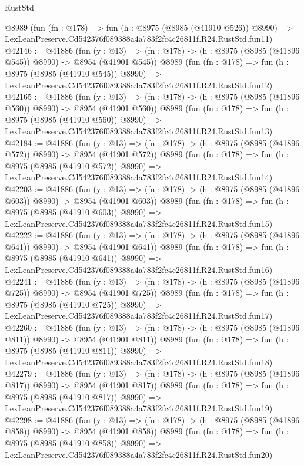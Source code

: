 \begin{lexlean}{RustStd}
\begin{coremodule}
    @8989
    (fun (fn : @178) =>
    fun (h : @8975 (@8985 (@41910 @526)) @8990) =>
    LexLeanPreserve.Cd542376f089388a4a783f2fc4c26811f.R24.RustStd.fun11)
@42146 := @41886
    (fun (y : @13) => (fn : @178) -> (h : @8975 (@8985 (@41896 @545)) @8990) -> @8954 (@41901 @545))
    @8989
    (fun (fn : @178) =>
    fun (h : @8975 (@8985 (@41910 @545)) @8990) =>
    LexLeanPreserve.Cd542376f089388a4a783f2fc4c26811f.R24.RustStd.fun12)
@42165 := @41886
    (fun (y : @13) => (fn : @178) -> (h : @8975 (@8985 (@41896 @560)) @8990) -> @8954 (@41901 @560))
    @8989
    (fun (fn : @178) =>
    fun (h : @8975 (@8985 (@41910 @560)) @8990) =>
    LexLeanPreserve.Cd542376f089388a4a783f2fc4c26811f.R24.RustStd.fun13)
@42184 := @41886
    (fun (y : @13) => (fn : @178) -> (h : @8975 (@8985 (@41896 @572)) @8990) -> @8954 (@41901 @572))
    @8989
    (fun (fn : @178) =>
    fun (h : @8975 (@8985 (@41910 @572)) @8990) =>
    LexLeanPreserve.Cd542376f089388a4a783f2fc4c26811f.R24.RustStd.fun14)
@42203 := @41886
    (fun (y : @13) => (fn : @178) -> (h : @8975 (@8985 (@41896 @603)) @8990) -> @8954 (@41901 @603))
    @8989
    (fun (fn : @178) =>
    fun (h : @8975 (@8985 (@41910 @603)) @8990) =>
    LexLeanPreserve.Cd542376f089388a4a783f2fc4c26811f.R24.RustStd.fun15)
@42222 := @41886
    (fun (y : @13) => (fn : @178) -> (h : @8975 (@8985 (@41896 @641)) @8990) -> @8954 (@41901 @641))
    @8989
    (fun (fn : @178) =>
    fun (h : @8975 (@8985 (@41910 @641)) @8990) =>
    LexLeanPreserve.Cd542376f089388a4a783f2fc4c26811f.R24.RustStd.fun16)
@42241 := @41886
    (fun (y : @13) => (fn : @178) -> (h : @8975 (@8985 (@41896 @725)) @8990) -> @8954 (@41901 @725))
    @8989
    (fun (fn : @178) =>
    fun (h : @8975 (@8985 (@41910 @725)) @8990) =>
    LexLeanPreserve.Cd542376f089388a4a783f2fc4c26811f.R24.RustStd.fun17)
@42260 := @41886
    (fun (y : @13) => (fn : @178) -> (h : @8975 (@8985 (@41896 @811)) @8990) -> @8954 (@41901 @811))
    @8989
    (fun (fn : @178) =>
    fun (h : @8975 (@8985 (@41910 @811)) @8990) =>
    LexLeanPreserve.Cd542376f089388a4a783f2fc4c26811f.R24.RustStd.fun18)
@42279 := @41886
    (fun (y : @13) => (fn : @178) -> (h : @8975 (@8985 (@41896 @817)) @8990) -> @8954 (@41901 @817))
    @8989
    (fun (fn : @178) =>
    fun (h : @8975 (@8985 (@41910 @817)) @8990) =>
    LexLeanPreserve.Cd542376f089388a4a783f2fc4c26811f.R24.RustStd.fun19)
@42298 := @41886
    (fun (y : @13) => (fn : @178) -> (h : @8975 (@8985 (@41896 @858)) @8990) -> @8954 (@41901 @858))
    @8989
    (fun (fn : @178) =>
    fun (h : @8975 (@8985 (@41910 @858)) @8990) =>
    LexLeanPreserve.Cd542376f089388a4a783f2fc4c26811f.R24.RustStd.fun20)

\end{coremodule}
\end{lexlean}
